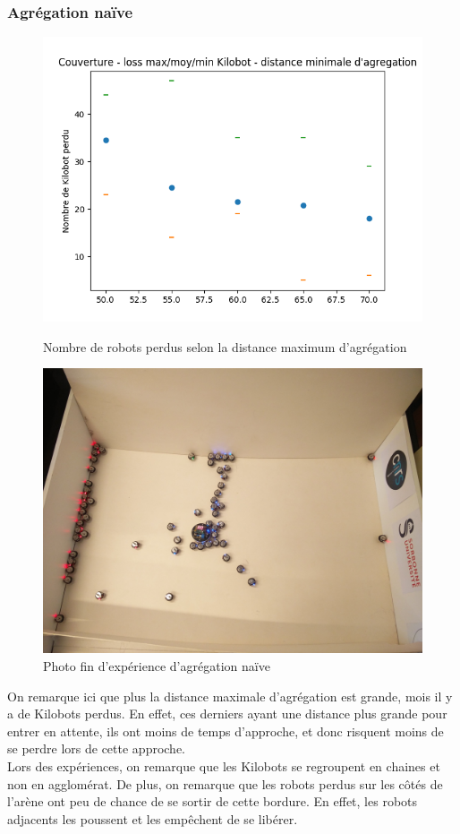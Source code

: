 \documentclass[a4paper]{article}
\begin{document}
\subsubsection{Agrégation naïve}
\begin{figure}[h]
	\begin{minipage}[c]{.46\linewidth}
		\centering
		\includegraphics[width=1.1\linewidth]{../../script_results/Agregation_naive_loss}
		\caption{Nombre de robots perdus selon la distance maximum d'agrégation}
	\end{minipage}
	\hfill%
	\begin{minipage}[c]{.46\linewidth}
		\centering
		\includegraphics[width=1.1\linewidth]{../../script_results/Resultats_aggreg_naive.jpg}
		\caption{Photo fin d'expérience d'agrégation naïve}
	\end{minipage}
\end{figure}
On remarque ici que plus la distance maximale d'agrégation est grande, mois il y a de Kilobots perdus. En effet, ces derniers ayant une distance plus grande pour entrer en attente, ils ont moins de temps d'approche, et donc risquent moins de se perdre lors de cette approche.\\
Lors des expériences, on remarque que les Kilobots se regroupent en chaines et non en agglomérat. De plus, on remarque que les robots perdus sur les côtés de l'arène ont peu de chance de se sortir de cette bordure. En effet, les robots adjacents les poussent et les empêchent de se libérer.
\newpage
\end{document}
